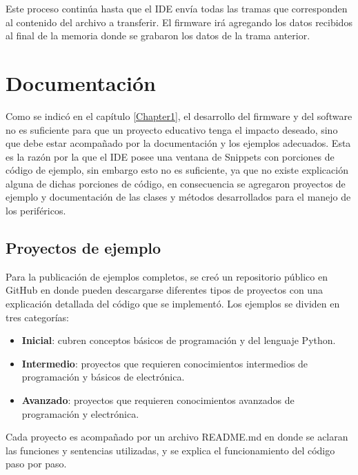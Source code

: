 Este proceso continúa hasta que el IDE envía todas las tramas que corresponden al contenido del archivo a transferir.
El firmware irá agregando los datos recibidos al final de la memoria donde se grabaron los datos de la trama anterior.



\section{Documentación}

Como se indicó en el capítulo \ref{Chapter1}, el desarrollo del firmware y del software no es suficiente para que un proyecto educativo tenga el impacto deseado, sino que debe estar acompañado por la documentación y los ejemplos adecuados. Esta es la razón por la que el IDE posee una ventana de Snippets con porciones de código de ejemplo, sin embargo esto no es suficiente, ya que no existe explicación alguna de dichas porciones de código, en consecuencia se agregaron proyectos de ejemplo y documentación de las clases y métodos desarrollados para el manejo de los periféricos.

\subsection{Proyectos de ejemplo} 

Para la publicación de ejemplos completos, se creó un repositorio público en GitHub \cite{repoejemplos} en donde pueden descargarse diferentes tipos de proyectos con una explicación detallada del código que se implementó. Los ejemplos se dividen en tres categorías:

\begin{itemize}
	\item \textbf{Inicial}: cubren conceptos básicos de programación y del lenguaje Python.
	\item \textbf{Intermedio}: proyectos que requieren conocimientos intermedios de programación y básicos de electrónica.
	\item \textbf{Avanzado}: proyectos que requieren conocimientos avanzados de programación y electrónica.	
\end{itemize}

Cada proyecto es acompañado por un archivo README.md en donde se aclaran las funciones y sentencias utilizadas, y se explica el funcionamiento del código paso por paso.

